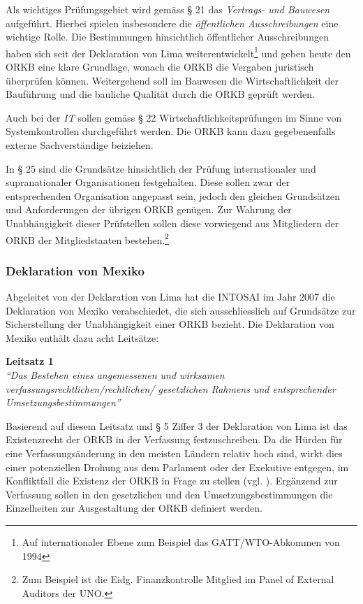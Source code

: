 \documentclass[10pt]{article}
\begin{document}
Als wichtiges Prüfungsgebiet wird gemäss § 21 das \textit{Vertrags- und Bauwesen} aufgeführt. Hierbei spielen insbesondere die \textit{öffentlichen Ausschreibungen} eine wichtige Rolle. Die Bestimmungen hinsichtlich öffentlicher Ausschreibungen haben sich seit der Deklaration von Lima weiterentwickelt\footnote{Auf internationaler Ebene zum Beispiel das GATT/WTO-Abkommen von 1994} und geben heute den ORKB eine klare Grundlage, wonach die ORKB die Vergaben juristisch überprüfen können. Weitergehend soll im Bauwesen die Wirtschaftlichkeit der Bauführung und die bauliche Qualität durch die ORKB geprüft werden. 

Auch bei der \textit{IT} sollen gemäss § 22 Wirtschaftlichkeitsprüfungen im Sinne von Systemkontrollen durchgeführt werden. Die ORKB kann dazu gegebenenfalls externe Sachverständige beiziehen.

In § 25 sind die Grundsätze hinsichtlich der Prüfung internationaler und supranationaler Organisationen festgehalten. Diese sollen zwar der entsprechenden Organisation angepasst sein, jedoch den gleichen Grundsätzen und Anforderungen der übrigen ORKB genügen. Zur Wahrung der Unabhängigkeit dieser Prüfstellen sollen diese vorwiegend aus Mitgliedern der ORKB der Mitgliedstaaten bestehen.\footnote{Zum Beispiel ist die Eidg. Finanzkontrolle Mitglied im Panel of External Auditors der UNO.}

\subsubsection{Deklaration von Mexiko}\label{subsubsec:deklaration_von_mexiko}
Abgeleitet von der Deklaration von Lima hat die INTOSAI im Jahr 2007 die Deklaration von Mexiko verabschiedet, die sich ausschliesslich auf Grundsätze zur Sicherstellung der Unabhängigkeit einer ORKB bezieht. Die Deklaration von Mexiko enthält dazu acht Leitsätze:

\textbf{Leitsatz 1}\\
\textit{“{}Das Bestehen eines angemessenen und wirksamen verfassungsrechtlichen/rechtlichen/ gesetzlichen Rahmens und entsprechender Umsetzungsbestimmungen”{}}

Basierend auf diesem Leitsatz und § 5 Ziffer 3 der Deklaration von Lima ist das Existenz­recht der ORKB in der Verfassung festzuschreiben. Da die Hürden für eine Verfassungs­änderung in den meisten Ländern relativ hoch sind, wirkt dies einer potenziellen Drohung aus dem Parlament oder der Exekutive entgegen, im Konfliktfall die Existenz der ORKB in Frage zu stellen (vgl. \cite[412]{Koller2002}). Ergänzend zur Verfassung sollen in den gesetzlichen und den Umsetzungsbestimmungen die Einzelheiten zur Ausgestaltung der ORKB definiert werden.
\end{document}
